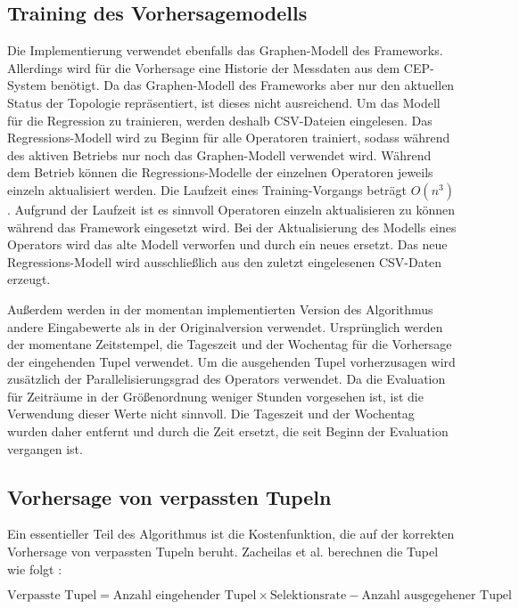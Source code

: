 \subsection{Training des Vorhersagemodells}

Die Implementierung verwendet ebenfalls das Graphen-Modell des Frameworks.
Allerdings wird für die Vorhersage eine Historie der Messdaten aus dem CEP-System benötigt.
Da das Graphen-Modell des Frameworks aber nur den aktuellen Status der Topologie repräsentiert, ist dieses nicht ausreichend.
Um das Modell für die Regression zu trainieren, werden deshalb CSV-Dateien eingelesen.
Das Regressions-Modell wird zu Beginn für alle Operatoren trainiert, sodass während des aktiven Betriebs nur noch das Graphen-Modell verwendet wird.
Während dem Betrieb können die Regressions-Modelle der einzelnen Operatoren jeweils einzeln aktualisiert werden.
Die Laufzeit eines Training-Vorgangs beträgt \(O(n^3)\) \cite{zacheilas_elastic_2015}.
Aufgrund der Laufzeit ist es sinnvoll Operatoren einzeln aktualisieren zu können während das Framework eingesetzt wird.
Bei der Aktualisierung des Modells eines Operators wird das alte Modell verworfen und durch ein neues ersetzt.
Das neue Regressions-Modell wird ausschließlich aus den zuletzt eingelesenen CSV-Daten erzeugt.

Außerdem werden in der momentan implementierten Version des Algorithmus andere Eingabewerte als in der Originalversion verwendet.
Ursprünglich werden der momentane Zeitstempel, die Tageszeit und der Wochentag für die Vorhersage der eingehenden Tupel verwendet.
Um die ausgehenden Tupel vorherzusagen wird zusätzlich der Parallelisierungsgrad des Operators verwendet.
Da die Evaluation für Zeiträume in der Größenordnung weniger Stunden vorgesehen ist, ist die Verwendung dieser Werte nicht sinnvoll.
Die Tageszeit und der Wochentag wurden daher entfernt und durch die Zeit ersetzt, die seit Beginn der Evaluation vergangen ist.

\subsection{Vorhersage von verpassten Tupeln}

Ein essentieller Teil des Algorithmus ist die Kostenfunktion, die auf der korrekten Vorhersage von verpassten Tupeln beruht.
Zacheilas et al. berechnen die Tupel wie folgt \cite{zacheilas_elastic_2015}:

\[\text{Verpasste Tupel} = \text{Anzahl eingehender Tupel} \times \text{Selektionsrate} - \text{Anzahl ausgegehener Tupel}\]

